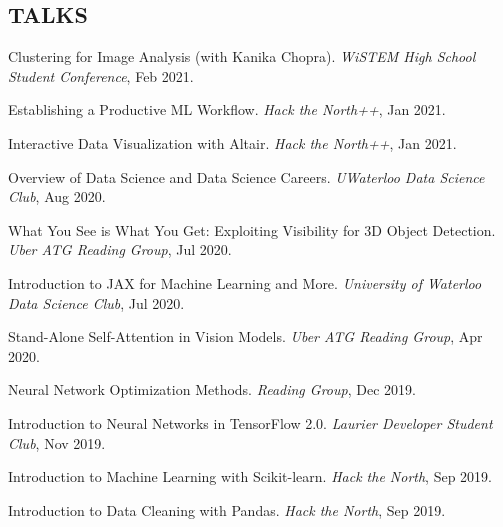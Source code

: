 \documentclass[line,margin]{res}
\newcommand{\talk}[4]{#1. \textit{#2}, #4. \vspace{-2mm}}
\begin{document}
\begin{resume}
\section{TALKS}
    \talk
    {Clustering for Image Analysis (with Kanika Chopra)}
    {WiSTEM High School Student Conference}{Virtual}{Feb 2021}

    \talk
    {Establishing a Productive ML Workflow}
    {Hack the North++}{Virtual}{Jan 2021}

    \talk
    {Interactive Data Visualization with Altair}
    {Hack the North++}{Virtual}{Jan 2021}

    \talk
    {Overview of Data Science and Data Science Careers}
    {UWaterloo Data Science Club}{Waterloo}{Aug 2020}

    \talk
    {What You See is What You Get: Exploiting Visibility for 3D Object Detection}
    {Uber ATG Reading Group}{Toronto}{Jul 2020}

    \talk
    {Introduction to JAX for Machine Learning and More}
    {University of Waterloo Data Science Club}{Waterloo}{Jul 2020}

    \talk
    {Stand-Alone Self-Attention in Vision Models}
    {Uber ATG Reading Group}{Toronto}{Apr 2020}

    \talk
    {Neural Network Optimization Methods}
    {Reading Group}{Waterloo}{Dec 2019}

    \talk
    {Introduction to Neural Networks in TensorFlow 2.0}
    {Laurier Developer Student Club}{Waterloo}{Nov 2019}

    \talk
    {Introduction to Machine Learning with Scikit-learn}
    {Hack the North}{Waterloo}{Sep 2019}

    \talk
    {Introduction to Data Cleaning with Pandas}
    {Hack the North}{Waterloo}{Sep 2019}

\end{resume}
\end{document}
